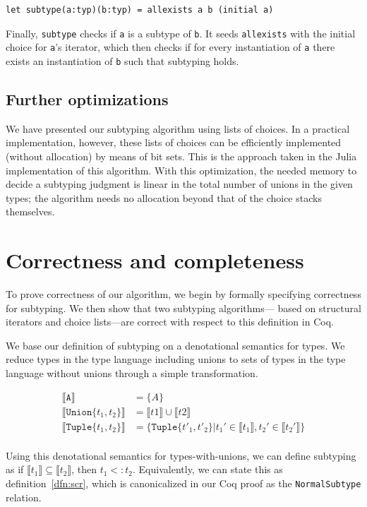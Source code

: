 \documentclass[a4paper,english]{lipics-v2019}
\newcommand{\xt}[1]{\texttt{#1}}
\newcommand{\tuplet}[2]{\xt{Tuple\{}#1,#2\xt{\}}}
\newcommand{\union}[2]{\xt{Union\{}#1,#2\xt{\}}}
\newcommand{\denotes}[1]{\llbracket #1 \rrbracket}
\begin{document}
\begin{lstlisting}
let subtype(a:typ)(b:typ) = allexists a b (initial a)
\end{lstlisting}

Finally, \verb|subtype| checks if \verb|a| is a subtype of \verb|b|.
It seeds \verb|allexists| with the initial choice for \verb|a|'s
iterator, which then checks if for every instantiation of \verb|a|
there exists an instantiation of \verb|b| such that subtyping holds.

\subsection{Further optimizations}

We have presented our subtyping algorithm using lists of choices. In a
practical implementation, however, these lists of choices can be efficiently
implemented (without allocation) by means of bit sets. This is the approach
taken in the Julia implementation of this algorithm. With this optimization,
the needed memory to decide a subtyping judgment is linear in the total number
of unions in the given types; the algorithm needs no allocation beyond that
of the choice stacks themselves.

\section{Correctness and completeness}

To prove correctness of our algorithm, we begin by formally specifying
correctness for subtyping. We then show that two subtyping algorithms---
based on structural iterators and choice lists---are correct
with respect to this definition in Coq.

We base our definition of subtyping on a denotational semantics for types. 
We reduce types in the type language including unions to sets of types
in the type language without unions through a simple transformation. 

\begin{align*}
\denotes{\xt{A}} &= \{A\} \\
\denotes{\union{t_1}{t_2}} &= \denotes{t1} \cup \denotes{t2} \\
\denotes{\tuplet{t_1}{t_2}} &= \{\tuplet{t'_1}{t'_2} | t_1' \in \denotes{t_1},  t_2' \in \denotes{t_2'}\} \\
\end{align*}

Using this denotational semantics for types-with-unions, we can define
subtyping as if $\denotes{t_1} \subseteq \denotes{t_2}$, then $t_1 <: t_2$.
Equivalently, we can state this as definition~\ref{dfn:scr}, which is canonicalized
in our Coq proof as the \verb|NormalSubtype| relation.
\end{document}
